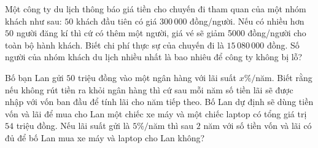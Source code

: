 \begin{bt}%
	Một công ty du lịch thông báo giá tiền cho chuyến đi tham quan của một nhóm khách như sau: $50$ khách đầu tiên có giá $300\,000$ đồng/người. Nếu có nhiều hơn $50$ người đăng kí thì cứ có thêm một người, giá vé sẽ giảm 5000 đồng/người cho toàn bộ hành khách. Biết chi phí thực sự của chuyến đi là $15\,080\,000$ đồng. Số người của nhóm khách du lịch nhiều nhất là bao nhiêu để  công ty không bị lỗ?
\end{bt}



\begin{bt}%
	Bố bạn Lan gửi $50$ triệu đồng vào một ngân hàng với lãi suất $x \% /$năm. Biết rằng nếu không rút tiền ra khỏi ngân hàng thì cứ sau mỗi năm số tiền lãi sẽ được nhập với vốn ban đầu để tính lãi cho năm tiếp theo. Bố Lan dự định sẽ dùng tiền vốn và lãi để mua cho Lan một chiếc xe máy và một chiếc laptop có tổng giá trị $54$ triệu đồng. Nếu lãi suất gửi là $5 \% /$năm thì sau $2$ năm với số tiền vốn và lãi có đủ để bố Lan mua xe  máy và laptop cho Lan không?
\end{bt}

